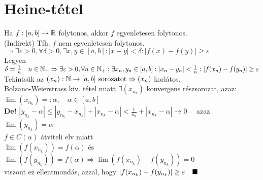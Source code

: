 \documentclass[a4paper,12pt]{article}
\begin{document}
\section{Heine-tétel}
	\tetel Ha $f:[a,b]\to\mathbb{R}$ folytonos, akkor $f$ egyenletesen folytonos.\\[0.2cm]
	\biz (Indirekt) Tfh. $f$ nem egyenletesen folytonos.\\[0.1cm] $\Rightarrow\exists\varepsilon > 0, \forall\delta > 0, \exists x,y\in[a,b]: |x-y| < \delta : |f(x) - f(y)| \geq\varepsilon$\\[0.1cm] Legyen $\delta = \frac{1}{n}\quad n\in\mathbb{N}_+ \Rightarrow \exists\varepsilon > 0, \forall n\in\mathbb{N}_+: \exists x_n,y_n\in[a,b]: |x_n-y_n| < \frac{1}{n}: |f(x_n)-f(y_n)|\geq\varepsilon$ \\[0.1cm] Tekintsük az $(x_n): \mathbb{N}\to[a,b]\text{ sorozatot}\Rightarrow (x_n)$ korlátos.\\[0.1cm] Bolzano-Weierstrass kiv. tétel miatt $\exists(x_{n_k})$ konvergens részsorozat, azaz:\\[0.1cm] $\lim(x_{n_k}) =: \alpha,\quad\alpha\in[a,b]$\\[0.1cm] \textbf{De!} $|y_{n_k}-\alpha|\leq|y_{n_k}-x_{n_k}|+|x_{n_k}-\alpha| < \frac{1}{n_k}+|x_{n_k}-\alpha|\to0\quad$ azaz $\lim(y_{n_k}) = \alpha$\\[0.1cm] $f\in C(\alpha)$ átviteli elv miatt\\[0.1cm]$\lim(f(x_{n_k})) = f(\alpha)$ és $\lim(f(y_{n_k})) = f(\alpha)\Rightarrow\lim(f(x_{n_k})-f(y_{n_k})) = 0$\\[0.1cm] viszont ez ellentmondás, azzal, hogy $|f(x_{n_k})-f(y_{n_k})|\geq\varepsilon\quad\blacksquare$
\end{document}
